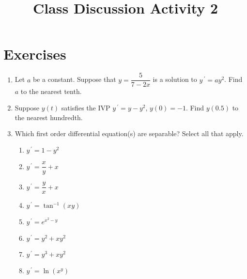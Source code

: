 \documentclass{ximera}
\begin{document}
\begin{abstract}
 \end{abstract}

    \title{Class Discussion Activity 2}
    
    \maketitle

\section*{Exercises}

\begin{enumerate}[label=(\arabic*)]

\item Let $a$ be a constant.  Suppose that $y=\dfrac{5}{7-2x}$ is a solution to $y\,^{\prime}=ay^2$.  Find $a$ to the nearest tenth.




\item Suppose $y(t)$ satisfies the IVP $y\,^{\prime}=y-y^2$, $y(0)=-1$.  Find $y(0.5)$ to the nearest hundredth.







\item Which first order differential equation(s) are separable?  Select all that apply.

\begin{enumerate}[label=(\alph*)]
\item $y^{\,\prime}=1-y^2$ %
\item $y^{\,\prime}=\dfrac{x}{y}+x$ %
\item $y^{\,\prime}=\dfrac{y}{x}+x$  
\item $y^{\,\prime}=\tan^{-1}(xy)$ 
\item $y^{\,\prime}=e^{x^2-y}$ %
\item $y^{\,\prime}=y^2+xy^2$ %
\item $y^{\,\prime}=y^3+xy^2$ 
\item $y^{\,\prime}=\ln \left(x^y\right)$ %
\end{enumerate}


\end{enumerate}
\end{document}
